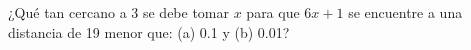 \item ¿Qué tan cercano a 3 se debe tomar $x$ para que $6x + 1$ se encuentre a una distancia de 19 menor que: (a) 0.1 y (b) 0.01?
